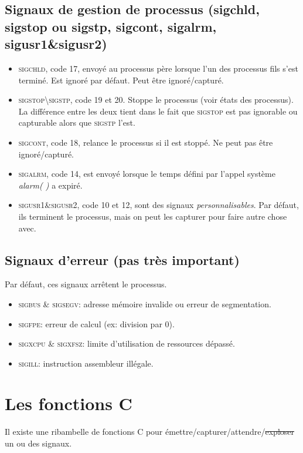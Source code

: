 \documentclass{report}
\begin{document}
\subsection{Signaux de gestion de processus (sigchld, sigstop ou sigstp, sigcont, sigalrm, sigusr1\&sigusr2)}
\begin{itemize}
\item \textsc{sigchld}, code 17, envoyé au processus père lorsque l'un des processus fils s'est terminé. Est ignoré par défaut. Peut être ignoré/capturé.
\item \textsc{sigstop\textbackslash sigstp}, code 19 et 20. Stoppe le processus (voir états des processus). La différence entre les deux tient dans le fait que \textsc{sigstop} est pas ignorable ou capturable alors que \textsc{sigstp} l'est.
\item \textsc{sigcont}, code 18, relance le processus si il est stoppé. Ne peut pas être ignoré/capturé.
\item \textsc{sigalrm}, code 14, est envoyé lorsque le temps défini par l'appel système \emph{alarm( )} a expiré.
\item \textsc{sigusr1\&sigusr2}, code 10 et 12, sont des signaux \emph{personnalisables}. Par défaut, ils terminent le processus, mais on peut les capturer pour faire autre chose avec.
\end{itemize}

\subsection{Signaux d'erreur (pas très important)}
Par défaut, ces signaux arrêtent le processus.
\begin{itemize}
\item \textsc{sigbus \& sigsegv}: adresse mémoire invalide ou erreur de segmentation.
\item \textsc{sigfpe}: erreur de calcul (ex: division par 0).
\item \textsc{sigxcpu \& sigxfsz}: limite d'utilisation de ressources dépassé.
\item \textsc{sigill}: instruction assembleur illégale.
\end{itemize}


\section{Les fonctions C}
Il existe une ribambelle de fonctions C pour émettre/capturer/attendre/\sout{exploser} un ou des signaux.
\end{document}
